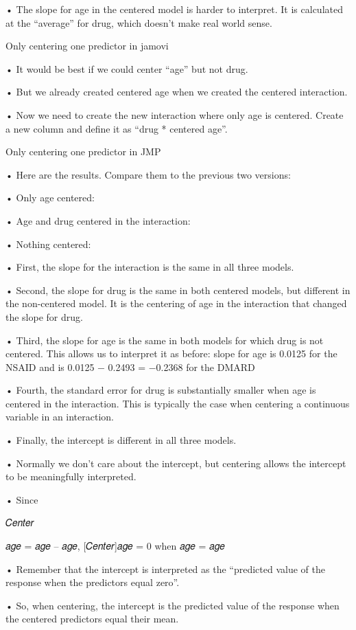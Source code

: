 \documentclass[
  letterpaper,
  DIV=11,
  numbers=noendperiod]{scrreprt}
\begin{document}
• The slope for age in the centered model is harder to interpret. It is
calculated at the ``average'' for drug, which doesn't make real world
sense.

Only centering one predictor in jamovi

• It would be best if we could center ``age'' but not drug.

• But we already created centered age when we created the centered
interaction.

• Now we need to create the new interaction where only age is centered.
Create a new column and define it as ``drug * centered age''.

Only centering one predictor in JMP

• Here are the results. Compare them to the previous two versions:

• Only age centered:

• Age and drug centered in the interaction:

• Nothing centered:

• First, the slope for the interaction is the same in all three models.

• Second, the slope for drug is the same in both centered models, but
different in the non-centered model. It is the centering of age in the
interaction that changed the slope for drug.

• Third, the slope for age is the same in both models for which drug is
not centered. This allows us to interpret it as before: slope for age is
0.0125 for the NSAID and is 0.0125 − 0.2493 = −0.2368 for the DMARD

• Fourth, the standard error for drug is substantially smaller when age
is centered in the interaction. This is typically the case when
centering a continuous variable in an interaction.

• Finally, the intercept is different in all three models.

• Normally we don't care about the intercept, but centering allows the
intercept to be meaningfully interpreted.

• Since

𝐶𝑒𝑛𝑡𝑒𝑟

𝑎𝑔𝑒 = 𝑎𝑔𝑒 -- 𝑎𝑔𝑒, {[}𝐶𝑒𝑛𝑡𝑒𝑟{]}𝑎𝑔𝑒 = 0 when 𝑎𝑔𝑒 = 𝑎𝑔𝑒

• Remember that the intercept is interpreted as the ``predicted value of
the response when the predictors equal zero''.

• So, when centering, the intercept is the predicted value of the
response when the centered predictors equal their mean.
\end{document}
